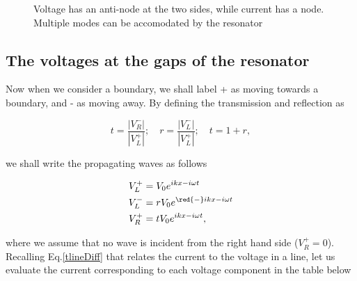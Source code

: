  \begin{figure}
 	\caption{Voltage has an anti-node at the two sides, while current has a node. Multiple modes can be accomodated by the resonator\label{tlineVI}}
 \end{figure}
 
 \subsection{The voltages at the gaps of the resonator}
 Now when we consider a boundary, we shall label + as moving towards a boundary, and - as moving away. By defining the transmission and reflection as
 
 \begin{equation}
 	t=\frac{|V_{R}^{-}|}{|V_{L}^{+}|};\quad r=\frac{|V_{L}^{-}|}{|V_{L}^{+}|};\quad t=1+r,
 \end{equation}
 
 \noindent we shall write the propagating waves as follows
 
 \begin{align}
	 V_L^{+} & = V_0e^{ikx-i\omega t}\\
	 V_L^{-} & = rV_0e^{\red{-}ikx-i\omega t}\\
	 V_R^{+} & = tV_0e^{ikx-i\omega t},
 \end{align}
 
 \noindent where we assume that no wave is incident from the right hand side ($ V_R^{+}=0 $). Recalling Eq.\eqref{tlineDiff} that relates the current to the voltage in a line, let us evaluate the current corresponding to each voltage component in the table below
 
